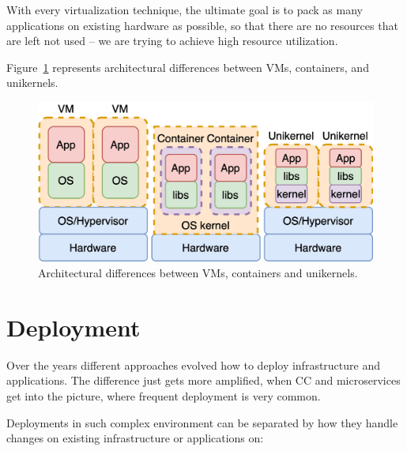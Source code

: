 \noindent
With every virtualization technique, the ultimate goal is to pack as many applications on existing hardware as possible, so that there are no resources that are left not used -- we are trying to achieve high resource utilization. 

Figure~\ref{fig:fig5} represents architectural differences between VMs, containers, and unikernels.

\begin{figure}[H]
	\begin{center}
		\includegraphics[scale=0.80]{images/Figure5}
	\end{center}
	\vspace{-0.6cm}
	\caption{Architectural differences between VMs, containers and unikernels.}
	\label{fig:fig5}
\end{figure}
%
%
\section{Deployment}\label{sec:deployment}
%
Over the years different approaches evolved how to deploy infrastructure and applications. The difference just gets more amplified, when CC and microservices get into the picture, where frequent deployment is very common. 

Deployments in such complex environment can be separated by how they handle changes on existing infrastructure or applications on:

